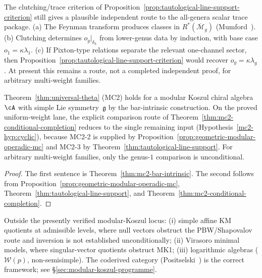 \begin{remark}
\label{rem:tautological-ring-verification}
The clutching/trace criterion of
Proposition~\ref{prop:tautological-line-support-criterion}
still gives a plausible independent route to the all-genera scalar
trace package.
\textup{(}a\textup{)} The Feynman transform produces classes in
$R^*(\overline{\mathcal{M}}_g)$ (Mumford~\cite{Mumford83}).
\textup{(}b\textup{)} Clutching determines $o_g|_{\delta_h}$ from
lower-genus data by induction, with base case
$o_1=\kappa\lambda_1$.
\textup{(}c\textup{)} If Pixton-type relations separate the
relevant one-channel sector, then
Proposition~\ref{prop:tautological-line-support-criterion}
would recover $o_g=\kappa\lambda_g$.
At present this remains a route, not a completed independent proof,
for arbitrary multi-weight families.
\end{remark}

\begin{corollary}
\label{cor:mc2-single-hypothesis}
Theorem~\textup{\ref{thm:universal-theta}} \textup{(MC2)} holds
for a modular Koszul chiral algebra $\cA$ with simple Lie
symmetry~$\mathfrak{g}$ by the bar-intrinsic construction.
On the proved uniform-weight lane, the explicit comparison route of
Theorem~\textup{\ref{thm:mc2-conditional-completion}} reduces to the
single remaining input
\textup{(}Hypothesis~\textup{\ref{mc2-hyp:cyclic}}\textup{)},
because MC2-2 is supplied by
Proposition~\textup{\ref{prop:geometric-modular-operadic-mc}} and
MC2-3 by Theorem~\textup{\ref{thm:tautological-line-support}}.
For arbitrary multi-weight families, only the genus-$1$ comparison is
unconditional.
\end{corollary}

\begin{proof}
The first sentence is
Theorem~\ref{thm:mc2-bar-intrinsic}.  The second follows from
Proposition~\ref{prop:geometric-modular-operadic-mc},
Theorem~\ref{thm:tautological-line-support}, and
Theorem~\ref{thm:mc2-conditional-completion}.
\end{proof}

\begin{remark}\label{rem:mk-non-examples}
Outside the presently verified modular-Koszul locus:
\textup{(}i\textup{)} simple affine KM quotients at admissible
levels, where null vectors obstruct the PBW/Shapovalov route and
inversion is not established unconditionally;
\textup{(}ii\textup{)} Virasoro minimal models, where singular-vector
quotients obstruct MK1;
\textup{(}iii\textup{)} logarithmic algebras
\textup{(}$\mathcal{W}(p)$, non-semisimple\textup{)}.
The coderived category (Positselski~\cite{Positselski11}) is the
correct framework; see \S\ref{sec:modular-koszul-programme}.
\end{remark}

